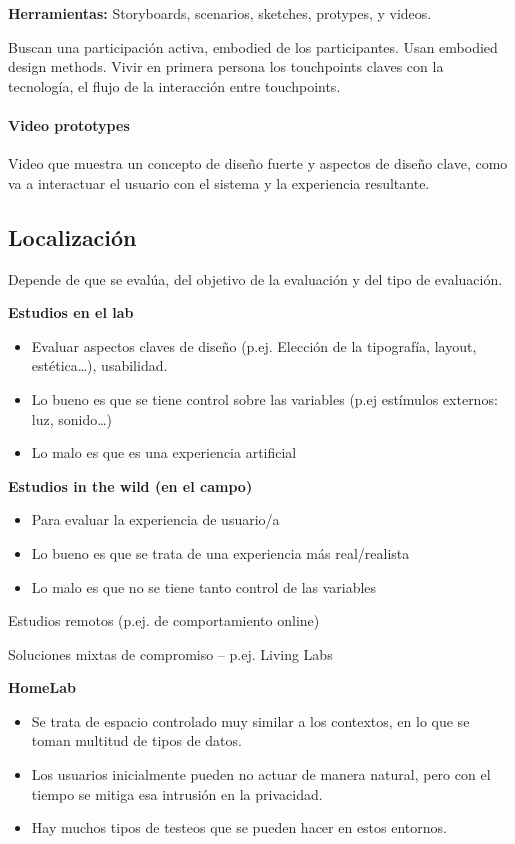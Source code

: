 \documentclass[12pt]{report} %
\begin{document}
\textbf{Herramientas:} Storyboards, scenarios, sketches, protypes, y videos.

Buscan una participación activa, embodied de los participantes. Usan embodied design methods. Vivir en primera persona los touchpoints claves con la tecnología, el flujo de la interacción entre touchpoints.

\paragraph{Video prototypes}
Video que muestra un concepto de diseño fuerte y aspectos de diseño clave, como va a interactuar el usuario con el sistema y la experiencia resultante.

\subsection{Localización}
Depende de que se evalúa, del objetivo de la evaluación y del tipo de evaluación.

\textbf{Estudios en el lab}
\begin{itemize}
  \item Evaluar aspectos claves de diseño (p.ej. Elección de la tipografía, layout, estética…),
  usabilidad.
  \item Lo bueno es que se tiene control sobre las variables (p.ej estímulos externos: luz, sonido…)
  \item Lo malo es que es una experiencia artificial
\end{itemize}

\textbf{Estudios in the wild (en el campo)}
\begin{itemize}
  \item Para evaluar la experiencia de usuario/a
  \item Lo bueno es que se trata de una experiencia más real/realista
  \item Lo malo es que no se tiene tanto control de las variables
\end{itemize}

Estudios remotos (p.ej. de comportamiento online)

Soluciones mixtas de compromiso – p.ej. Living Labs

\textbf{HomeLab}
\begin{itemize}
  \item Se trata de espacio controlado muy similar a los contextos, en lo que se toman multitud de tipos de datos.
  \item Los usuarios inicialmente pueden no actuar de manera natural, pero con el tiempo se mitiga esa intrusión en la privacidad.
  \item Hay muchos tipos de testeos que se pueden hacer en estos entornos.
\end{itemize}
\end{document}
